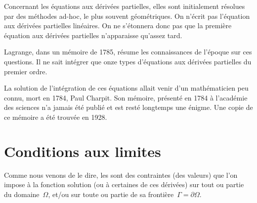 \medskip
\begin{histoire}%
Concernant les équations aux dérivées partielles, elles sont initialement résolues par des méthodes ad-hoc, le plus souvent 
géométriques. 
On n'écrit pas l'équation aux dérivées partielles linéaires. On ne s'étonnera donc pas que la première équation aux dérivées partielles 
n'apparaisse qu'assez tard.

\medskip
{}

\medskip
Lagrange, 
dans un mémoire de 1785, résume les connaissances de l'époque sur ces questions. 
Il ne sait intégrer que onze types d'équations aux dérivées partielles du premier ordre.

\medskip
La solution de l'intégration de ces équations allait venir d'un mathématicien peu connu, 
mort en 1784, Paul Charpit.
Son mémoire, présenté en 1784 à l'académie des sciences n'a 
jamais été publié et est resté longtemps une énigme. Une copie de ce mémoire a été
trouvée en 1928.
\end{histoire}

\medskip
\section{Conditions aux limites}

Comme nous venons de le dire, les  sont des
contraintes (des valeurs) que l'on impose à la fonction solution (ou à certaines de
ces dérivées) sur tout ou partie du domaine~$\Omega$, et/ou sur toute ou partie 
de sa frontière~$\Gamma=\partial\Omega$.

